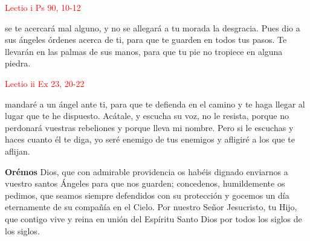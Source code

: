 \noindent\textcolor{red}{Lectio i \hfill Ps 90, 10-12}

se te acercará mal alguno, y no se allegará a tu morada la desgracia. Pues dio a sus ángeles órdenes acerca de ti, para que te guarden en todos tus pasos.
Te llevarán en las palmas de sus manos, para que tu pie no tropiece en alguna piedra.

\vspace{0.5em}

\noindent\textcolor{red}{Lectio ii \hfill Ex 23, 20-22}

mandaré a un ángel ante ti, para que te defienda en el camino y te haga llegar al lugar que te he dispuesto. Acátale, y escucha su voz,
no le resista, porque no perdonará vuestras rebeliones y porque lleva mi nombre. Pero si le escuchas y haces cuanto él te diga, yo seré
enemigo de tus enemigos y afligiré a los que te aflijan.

\vspace{0.5em}


\vspace{0.5em}

\textbf{Orémos}
Dios, que con admirable providencia os habéis dignado enviarnos a vuestro santos Ángeles para que nos guarden; concedenos, humildemente os pedimos,
que seamos siempre defendidos con su protección y gocemos un día eternamente de su compañía en el Cielo. Por nuestro Señor Jesucristo, tu Hijo, que contigo vive y reina
en unión del Espíritu Santo Dios por todos los siglos de los siglos. 

\vspace{0.5em}

\begin{otherlanguage}{latin}
    

    \vspace{0.25em}

    

    \vspace{0.25em}

    

    \vspace{0.25em}

    
\end{otherlanguage}